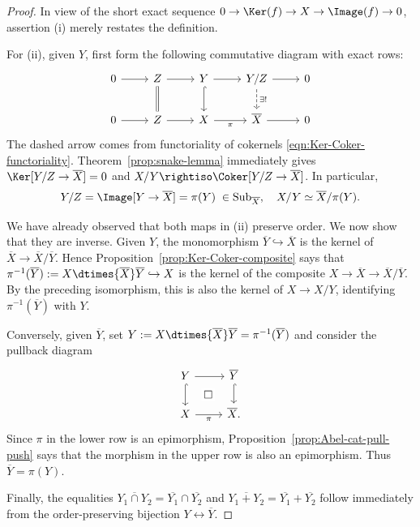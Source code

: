 \begin{proof}
	In view of the short exact sequence
	$0\to\Ker(f)\to X\to\Image(f)\to0$, assertion (i) merely restates the
	definition.

	For (ii), given $Y$, first form the following commutative diagram with
	exact rows:
	\[\begin{tikzcd}
		0 \arrow[r] & Z \arrow[r] \arrow[equal, d] & Y \arrow[r] \arrow[hookrightarrow, d] & Y/Z \arrow[dashed, d, "\exists!"] \arrow[r] & 0 \\
		0 \arrow[r] & Z \arrow[r] & X \arrow[r, "\pi"'] & \overline{X} \arrow[r] & 0
	\end{tikzcd}\]
	The dashed arrow comes from functoriality of cokernels
	\eqref{eqn:Ker-Coker-functoriality}. Theorem~\ref{prop:snake-lemma}
	immediately gives $\Ker[Y/Z\to\overline{X}]=0$ and
	$X/Y\rightiso\Coker[Y/Z\to\overline{X}]$. In particular,
	\[ Y/Z =  \Image[Y \to \overline{X}] = \pi(Y) \;\in \mathrm{Sub}_{\overline{X}}, \quad X/Y \simeq \overline{X}/\pi(Y). \]

	We have already observed that both maps in (ii) preserve order. We now show
	that they are inverse. Given $Y$, the monomorphism
	$\overline{Y}\hookrightarrow\overline{X}$ is the kernel of
	$\overline{X}\to\overline{X}/\overline{Y}$. Hence
	Proposition~\ref{prop:Ker-Coker-composite} says that
	$\pi^{-1}(\overline{Y}):=X\dtimes{\overline{X}}\overline{Y}\hookrightarrow X$
	is the kernel of the composite
	$X\to\overline{X}\to\overline{X}/\overline{Y}$. By the preceding
	isomorphism, this is also the kernel of $X\to X/Y$, identifying
	$\pi^{-1}(\overline{Y})$ with $Y$.

	Conversely, given $\overline{Y}$, set
	$Y:=X\dtimes{\overline{X}}\overline{Y}=\pi^{-1}(\overline{Y})$ and
	consider the pullback diagram
	\[\begin{tikzcd}
		Y \arrow[r] \arrow[hookrightarrow, d] & \overline{Y} \arrow[hookrightarrow, d] \\
		X \arrow[r, "\pi"'] & \overline{X} \arrow[phantom, lu, "\Box" description] .
	\end{tikzcd}\]
	Since $\pi$ in the lower row is an epimorphism,
	Proposition~\ref{prop:Abel-cat-pull-push} says that the morphism in the
	upper row is also an epimorphism. Thus $\overline{Y}=\pi(Y)$.

	Finally, the equalities
	$\overline{Y_1\cap Y_2}=\overline{Y_1}\cap\overline{Y_2}$ and
	$\overline{Y_1+Y_2}=\overline{Y_1}+\overline{Y_2}$ follow immediately
	from the order-preserving bijection $Y\leftrightarrow\overline{Y}$.


\end{proof}
